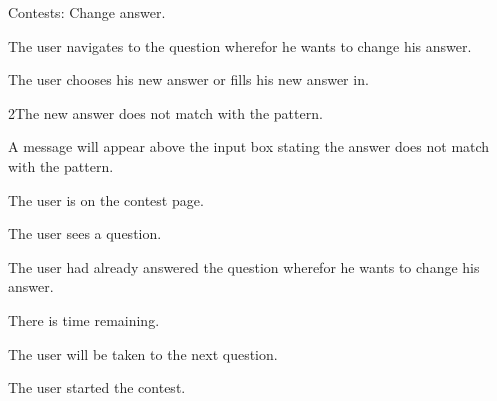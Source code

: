 \documentclass[10pt,a4paper]{article}
\begin{document}
\begin{uc}{Contests: Change answer.}


    \begin{uc-mss}
    \item The user navigates to the question wherefor he wants to change his answer.
    \item The user chooses his new answer or fills his new answer in.
    \end{uc-mss}

    \begin{uc-ext}

        \begin{uc-fail}{2}{The new answer does not match with the pattern.}
        \item A message will appear above the input box stating the answer does not match with the pattern.
        \end{uc-fail}

    \end{uc-ext}

    \begin{uc-pre}
    \item The user is on the contest page.
    \item The user sees a question. 
    \item The user had already answered the question wherefor he wants to change his answer.
    \item There is time remaining. 
    \end{uc-pre}

    \begin{uc-post}
    \item The user will be taken to the next question.
    \end{uc-post}

    \begin{uc-trig}
    The user started the contest. 
    \end{uc-trig}

\end{uc}
\end{document}

